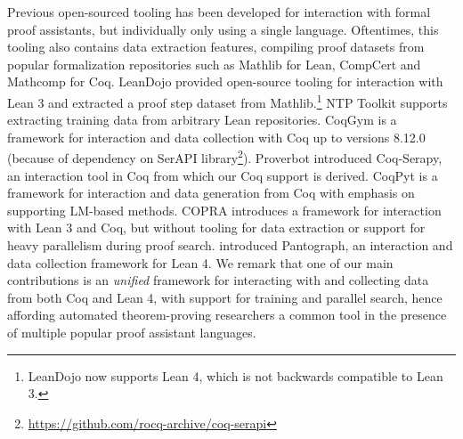 Previous open-sourced tooling has been developed for interaction with formal proof assistants, but individually only using a single language. Oftentimes, this tooling also contains data extraction features, compiling proof datasets from popular formalization repositories such as Mathlib \citep{mathlib} for Lean, CompCert \citep{leroy2009formal} and Mathcomp \citep{githubGitHubMathcompmathcomp} for Coq. LeanDojo \citep{yang2023leandojo} provided open-source tooling for interaction with Lean 3 and extracted a proof step dataset from Mathlib.\footnote{LeanDojo now supports Lean 4, which is not backwards compatible to Lean 3.} NTP Toolkit \citep{ntptoolkit} supports extracting training data from arbitrary Lean repositories. CoqGym \citep{yang2019learning} is a framework for interaction and data collection with Coq up to versions 8.12.0 (because of dependency on SerAPI library\footnote{\href{https://github.com/rocq-archive/coq-serapi}{https://github.com/rocq-archive/coq-serapi}}). Proverbot \citep{sanchez2020generating} introduced Coq-Serapy, an interaction tool in Coq from which our Coq support is derived. CoqPyt \citep{CoqPyt} is a framework for interaction and data generation from Coq with emphasis on supporting LM-based methods. COPRA \citep{thakur2024incontext} introduces a framework for interaction with Lean 3 and Coq, but without tooling for data extraction or support for heavy parallelism during proof search. \citet{pantograph} introduced Pantograph, an interaction and data collection framework for Lean 4. We remark that one of our main contributions is an \emph{unified} framework for interacting with and collecting data from both Coq and Lean 4, with support for training and parallel search, hence affording automated theorem-proving researchers a common tool in the presence of multiple popular proof assistant languages.

